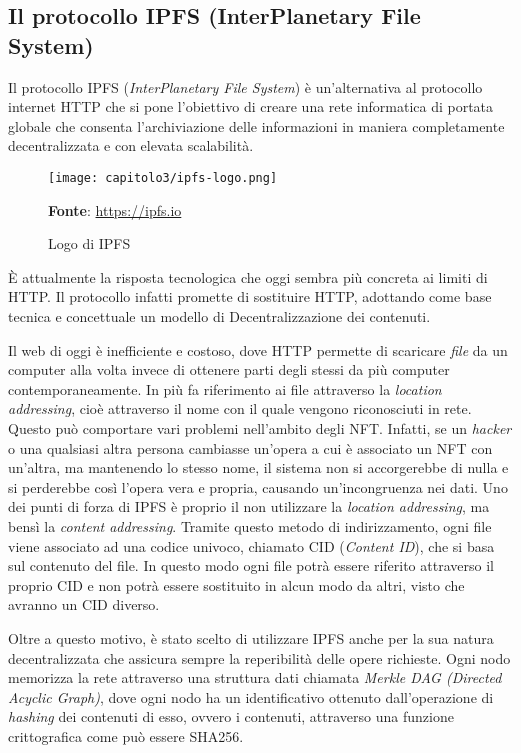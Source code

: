 
\subsection{Il protocollo IPFS (InterPlanetary File System)}
Il protocollo IPFS (\textit{InterPlanetary File System}) è un'alternativa al protocollo internet HTTP che si pone l'obiettivo di creare una rete informatica di portata globale che consenta l'archiviazione delle informazioni in maniera completamente decentralizzata e con elevata scalabilità.

\begin{figure}[h!]
  \centering
  \texttt{[image: capitolo3/ipfs-logo.png]}
  \caption{Logo di IPFS}
  \textbf{Fonte}: \href{https://ipfs.io}{https://ipfs.io}
\end{figure}

È attualmente la risposta tecnologica che oggi sembra più concreta ai limiti di HTTP. Il protocollo infatti promette di sostituire HTTP, adottando come base tecnica e concettuale un modello di Decentralizzazione dei contenuti.

Il web di oggi è inefficiente e costoso, dove HTTP permette di scaricare \textit{file} da un computer alla volta invece di ottenere parti degli stessi da più computer contemporaneamente. In più fa riferimento ai file attraverso la \textit{location addressing}, cioè attraverso il nome con il quale vengono riconosciuti in rete. Questo può comportare vari problemi nell'ambito degli NFT. Infatti, se un \textit{hacker} o una qualsiasi altra persona cambiasse un'opera a cui è associato un NFT con un'altra, ma mantenendo lo stesso nome, il sistema non si accorgerebbe di nulla e si perderebbe così l'opera vera e propria, causando un'incongruenza nei dati. 
Uno dei punti di forza di IPFS è proprio il non utilizzare la \textit{location addressing}, ma bensì la \textit{content addressing}. Tramite questo metodo di indirizzamento, ogni file viene associato ad una codice univoco, chiamato CID (\textit{Content ID}), che si basa sul contenuto del file. In questo modo ogni file potrà essere riferito attraverso il proprio CID e non potrà essere sostituito in alcun modo da altri, visto che avranno un CID diverso.

Oltre a questo motivo, è stato scelto di utilizzare IPFS anche per la sua natura decentralizzata che assicura sempre la reperibilità delle opere richieste. Ogni nodo memorizza la rete attraverso una struttura dati chiamata \textit{Merkle DAG (Directed Acyclic Graph)}, dove ogni nodo ha un identificativo ottenuto dall'operazione di \textit{hashing} dei contenuti di esso, ovvero i  contenuti, attraverso una funzione crittografica come può essere SHA256.

